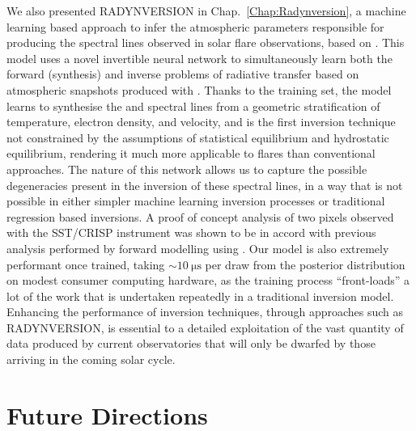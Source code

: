 We also presented RADYNVERSION in Chap.~\ref{Chap:Radynversion}, a machine learning based approach to infer the atmospheric parameters responsible for producing the spectral lines observed in solar flare observations, based on \Radyn{}.
This model uses a novel invertible neural network to simultaneously learn both the forward (synthesis) and inverse problems of radiative transfer based on atmospheric snapshots produced with \Radyn{}.
Thanks to the training set, the model learns to synthesise the \Ha{} and \CaLine{} spectral lines from a geometric stratification of temperature, electron density, and velocity, and is the first inversion technique not constrained by the assumptions of statistical equilibrium and hydrostatic equilibrium, rendering it much more applicable to flares than conventional approaches.
The nature of this network allows us to capture the possible degeneracies present in the inversion of these spectral lines, in a way that is not possible in either simpler machine learning inversion processes or traditional regression based inversions.
A proof of concept analysis of two pixels observed with the SST/CRISP instrument was shown to be in accord with previous analysis performed by forward modelling using \Radyn{}.
Our model is also extremely performant once trained, taking $\sim\SI{10}{\micro\s}$ per draw from the posterior distribution on modest consumer computing hardware, as the training process ``front-loads'' a lot of the work that is undertaken repeatedly in a traditional inversion model.
Enhancing the performance of inversion techniques, through approaches such as RADYNVERSION, is essential to a detailed exploitation of the vast quantity of data produced by current observatories that will only be dwarfed by those arriving in the coming solar cycle.

\section*{Future Directions}

